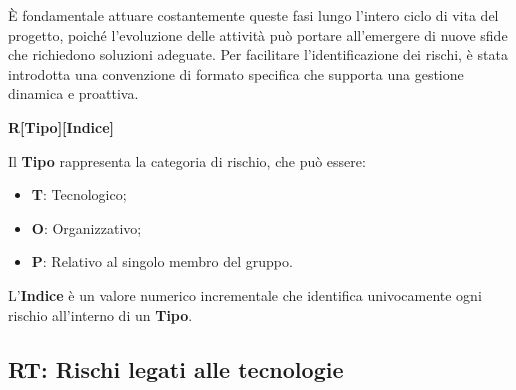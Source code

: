 È fondamentale attuare costantemente queste fasi lungo l'intero ciclo di vita del progetto, poiché l'evoluzione delle attività può portare all'emergere di nuove sfide che richiedono soluzioni adeguate. Per facilitare l'identificazione dei rischi, è stata introdotta una convenzione di formato specifica che supporta una gestione dinamica e proattiva.
\begin{center}
\textbf{R[Tipo][Indice]}
\end{center}
Il \textbf{Tipo} rappresenta la categoria di rischio, che può essere:
\begin{itemize}
    \item \textbf{T}: Tecnologico;
    \item \textbf{O}: Organizzativo;
    \item \textbf{P}: Relativo al singolo membro del gruppo.
\end{itemize}

L'\textbf{Indice} è un valore numerico incrementale che identifica univocamente ogni rischio all'interno di un \textbf{Tipo}.

\newpage

\subsection{RT: Rischi legati alle tecnologie}

